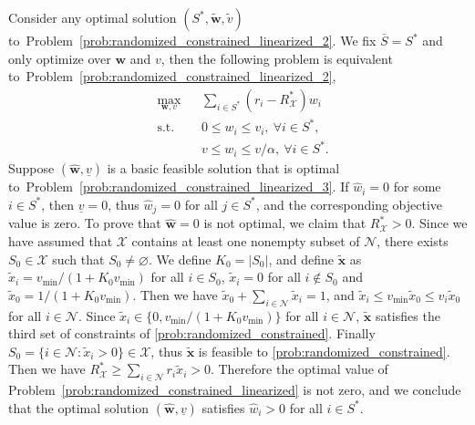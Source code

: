 \documentclass[mnsc,non-blindrev]{informs3}
\theoremstyle{definition}
\begin{document}
\begin{appendices}{\Large{}}
Consider any optimal solution $(S^*,\tilde{\bm{w}},\tilde{v})$ to~Problem~\eqref{prob:randomized_constrained_linearized_2}. We fix $\bar{S}=S^*$ and only optimize over $\bm{w}$ and $v$, then the following problem is equivalent to~Problem~\eqref{prob:randomized_constrained_linearized_2},
\begin{equation}\label{prob:randomized_constrained_linearized_3}
\begin{aligned}
&\max_{\bm{w},v}&&\sum_{i\in S^*}(r_i-R^*_{\mathcal{X}})w_i\\
&\text{s.t.}&&0\leq w_i\leq v_i,\ \forall i\in S^*,\\
&&& v\leq w_i\leq v/\alpha,\ \forall i\in S^*.
\end{aligned}
\end{equation}
Suppose $(\hat{\bm{w}},\underline{v})$ is a basic feasible solution that is optimal to~Problem~\eqref{prob:randomized_constrained_linearized_3}. If $\hat{w}_i=0$ for some $i\in S^*$, then $\underline{v}=0$, thus $\hat{w}_j=0$ for all $j\in S^*$, and the corresponding objective value is zero. To prove that $\hat{\bm{w}}=0$ is not optimal, we claim that $R^*_{\mathcal{X}}>0$. Since we have assumed that $\mathcal{X}$ contains at least one nonempty subset of $\mathcal{N}$, there exists $S_0\in\mathcal{X}$ such that $S_0\neq \varnothing$. We define $K_0=|S_0|$, and define $\tilde{\bm{x}}$ as $\tilde{x}_i=v_{\min}/(1+K_0v_{\min})$ for all $i\in S_0$, $\tilde{x}_i=0$ for all $i\notin S_0$ and $\tilde{x}_0=1/(1+K_0v_{\min})$. Then we have $\tilde{x}_0+\sum_{i\in\mathcal{N}}\tilde{x}_i=1$, and $\tilde{x}_i\leq v_{\min}\tilde{x}_0\leq v_i\tilde{x}_0$ for all $i\in\mathcal{N}$. Since $\tilde{x}_i\in\{0,v_{\min}/(1+K_0v_{\min})\}$ for all $i\in\mathcal{N}$, $\tilde{\bm{x}}$ satisfies the third set of constraints of \ref{prob:randomized_constrained}. Finally $S_0=\{i\in\mathcal{N}:\tilde{x}_i>0\}\in\mathcal{X}$, thus $\tilde{\bm{x}}$ is feasible to \ref{prob:randomized_constrained}. Then we have $R_{\mathcal{X}}^*\geq \sum_{i\in\mathcal{N}}r_i\tilde{x}_i>0$. Therefore the optimal value of Problem~\eqref{prob:randomized_constrained_linearized} is not zero, and we conclude that the optimal solution $(\hat{\bm{w}},\underline{v})$ satisfies $\hat{w}_i>0$ for all $i\in S^*$.


\end{appendices}
\end{document}

